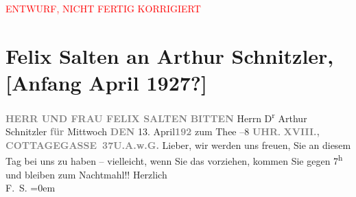 
\begin{center}
            \textcolor{red}{ENTWURF, NICHT FERTIG KORRIGIERT}
                      \end{center}
            
         \renewcommand{\erwaehnteOrte}{Orte: Cottagegasse, Wien}
         \renewcommand{\erwaehnteWerke}{}
               \section[Felix Salten an Arthur Schnitzler, {[}Anfang April 1927?{]}]{ Felix Salten an Arthur Schnitzler, {[}Anfang April 1927?{]}}\nopagebreak{}\rehead{ }\begin{ledgroupsized}[t]{13cm}\normalsize\beginnumbering \toendnotes[C]{\smallbreak\pagebreak[2]} 
\pstart
           \noindent{}\centering{}{\pb}\textcolor{gray}{\textbf{HERR UND FRAU FELIX SALTEN}}\pend
           \pstart
           \noindent{}\textcolor{gray}{\textbf{BITTEN}} Herrn D\textsuperscript{r}\pend
           \pstart
           Arthur Schnitzler\pend
           \pstart
           \textcolor{gray}{\textbf{für}}{ }Mittwoch \textcolor{gray}{\textbf{DEN}} 13. April\textcolor{gray}{\textbf{192}}\pend
           \pstart
           zum Thee\pend
           –8 \textcolor{gray}{\textbf{UHR}}.\pend
           \pstart
           \textcolor{gray}{\textbf{XVIII., COTTAGEGASSE 37}}\hfill \textcolor{gray}{\textbf{U.A.w.G.}}\pend
           \pstart
           Lieber, wir werden uns freuen, Sie an diesem Tag bei uns zu haben –
               vielleicht, wenn Sie das vorziehen, kommen Sie gegen 7\textsuperscript{h}
               und bleiben zum Nachtmahl!!\pend
           \pstart
           Herzlich {\\[\baselineskip]}\spacefill\mbox{F. S.}\pend
           \leftskip=0em{}
         
         \endnumbering{}\end{ledgroupsized}\begin{anhang}\end{anhang}\newcommand{\dateiname}{L03581}\newcommand{\titel}{Felix Salten an Arthur Schnitzler, [Anfang April 1927?]}\newcommand{\editorInnen}{Martin Anton Müller und Laura Untner}
      